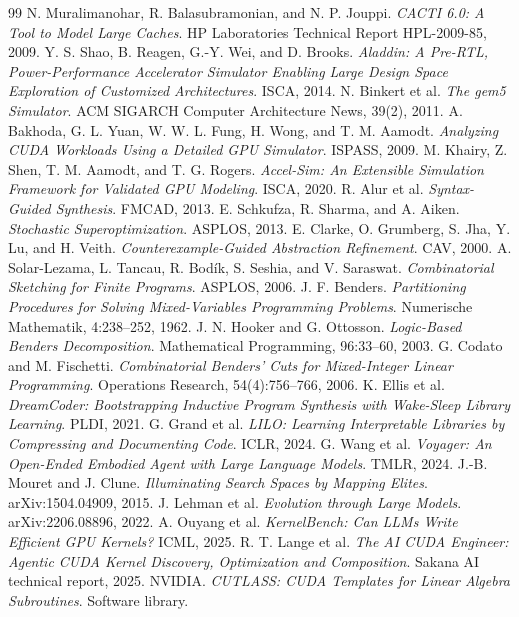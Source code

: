 \documentclass[11pt]{article}
\begin{document}
\begin{thebibliography}{99}
 N. Muralimanohar, R. Balasubramonian, and N. P. Jouppi. \emph{CACTI 6.0: A Tool to Model Large Caches}. HP Laboratories Technical Report HPL-2009-85, 2009.
 Y. S. Shao, B. Reagen, G.-Y. Wei, and D. Brooks. \emph{Aladdin: A Pre-RTL, Power-Performance Accelerator Simulator Enabling Large Design Space Exploration of Customized Architectures}. ISCA, 2014.
 N. Binkert et al. \emph{The gem5 Simulator}. ACM SIGARCH Computer Architecture News, 39(2), 2011.
 A. Bakhoda, G. L. Yuan, W. W. L. Fung, H. Wong, and T. M. Aamodt. \emph{Analyzing CUDA Workloads Using a Detailed GPU Simulator}. ISPASS, 2009.
 M. Khairy, Z. Shen, T. M. Aamodt, and T. G. Rogers. \emph{Accel-Sim: An Extensible Simulation Framework for Validated GPU Modeling}. ISCA, 2020.
 R. Alur et al. \emph{Syntax-Guided Synthesis}. FMCAD, 2013.
 E. Schkufza, R. Sharma, and A. Aiken. \emph{Stochastic Superoptimization}. ASPLOS, 2013.
 E. Clarke, O. Grumberg, S. Jha, Y. Lu, and H. Veith. \emph{Counterexample-Guided Abstraction Refinement}. CAV, 2000.
 A. Solar-Lezama, L. Tancau, R. Bodík, S. Seshia, and V. Saraswat. \emph{Combinatorial Sketching for Finite Programs}. ASPLOS, 2006.
 J. F. Benders. \emph{Partitioning Procedures for Solving Mixed-Variables Programming Problems}. Numerische Mathematik, 4:238--252, 1962.
 J. N. Hooker and G. Ottosson. \emph{Logic-Based Benders Decomposition}. Mathematical Programming, 96:33--60, 2003.
 G. Codato and M. Fischetti. \emph{Combinatorial Benders' Cuts for Mixed-Integer Linear Programming}. Operations Research, 54(4):756--766, 2006.
 K. Ellis et al. \emph{DreamCoder: Bootstrapping Inductive Program Synthesis with Wake-Sleep Library Learning}. PLDI, 2021.
 G. Grand et al. \emph{LILO: Learning Interpretable Libraries by Compressing and Documenting Code}. ICLR, 2024.
 G. Wang et al. \emph{Voyager: An Open-Ended Embodied Agent with Large Language Models}. TMLR, 2024.
 J.-B. Mouret and J. Clune. \emph{Illuminating Search Spaces by Mapping Elites}. arXiv:1504.04909, 2015.
 J. Lehman et al. \emph{Evolution through Large Models}. arXiv:2206.08896, 2022.
 A. Ouyang et al. \emph{KernelBench: Can LLMs Write Efficient GPU Kernels?} ICML, 2025.
 R. T. Lange et al. \emph{The AI CUDA Engineer: Agentic CUDA Kernel Discovery, Optimization and Composition}. Sakana AI technical report, 2025.
 NVIDIA. \emph{CUTLASS: CUDA Templates for Linear Algebra Subroutines}. Software library.

\end{thebibliography}
\end{document}

